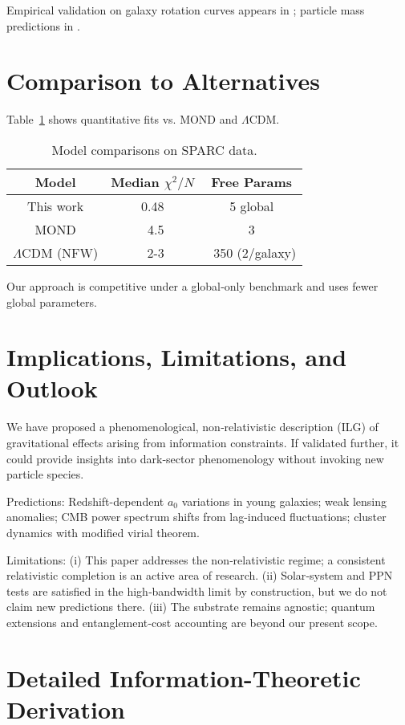 \documentclass[twocolumn,prd,amsmath,amssymb,aps,superscriptaddress,nofootinbib]{revtex4-2}
\begin{document}
Empirical validation on galaxy rotation curves appears in \cite{Washburn2025a}; particle mass predictions in \cite{Washburn2025b}.

\section{Comparison to Alternatives}

Table~\ref{tab:comparison} shows quantitative fits vs. MOND and $\Lambda$CDM.

\begin{table}
\caption{Model comparisons on SPARC data.}
\label{tab:comparison}
\begin{tabular}{ccc}
\hline
Model & Median $\chi^2/N$ & Free Params \\
\hline
This work & 0.48 & 5 global \\
MOND & ~4.5 & 3 \\
$\Lambda$CDM (NFW) & ~2-3 & ~350 (2/galaxy) \\
\hline
\end{tabular}
\end{table}

Our approach is competitive under a global‑only benchmark and uses fewer global parameters.

\section{Implications, Limitations, and Outlook}
\label{sec:conclusion}

We have proposed a phenomenological, non‑relativistic description (ILG) of gravitational effects arising from information constraints. If validated further, it could provide insights into dark‑sector phenomenology without invoking new particle species.

Predictions: Redshift-dependent $a_0$ variations in young galaxies; weak lensing anomalies; CMB power spectrum shifts from lag-induced fluctuations; cluster dynamics with modified virial theorem.

Limitations: (i) This paper addresses the non‑relativistic regime; a consistent relativistic completion is an active area of research. (ii) Solar‑system and PPN tests are satisfied in the high‑bandwidth limit by construction, but we do not claim new predictions there. (iii) The substrate remains agnostic; quantum extensions and entanglement‑cost accounting are beyond our present scope.

\appendix

\section{Detailed Information-Theoretic Derivation}
\end{document}
